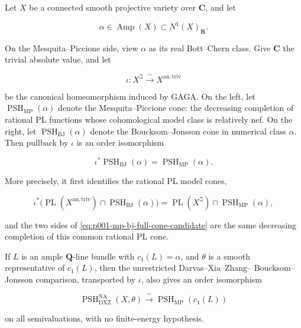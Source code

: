 
\begin{theorem}
\label{thm:p001-mp-bj-full-cone-candidate}
Let \(X\) be a connected smooth projective variety over \(\mathbf C\), and
let

\[
                     \alpha\in\operatorname{Amp}(X)
                              \subset N^1(X)_{\mathbf R}.
\]

On the Mesquita--Piccione side, view \(\alpha\) as its real Bott--Chern
class.  Give \(\mathbf C\) the trivial absolute value, and let

\[
 \iota:X^{\beth}\xrightarrow{\ \sim\ }X^{\mathrm{an,triv}}
\]

be the canonical homeomorphism induced by GAGA.  On the left, let
\(\operatorname{PSH}_{\mathrm{MP}}(\alpha)\) denote the
Mesquita--Piccione cone: the decreasing completion of rational PL
functions whose cohomological model class is relatively nef.  On the
right, let
\(\operatorname{PSH}_{\mathrm{BJ}}(\alpha)\) denote the
Boucksom--Jonsson cone in numerical class \(\alpha\).  Then pullback by
\(\iota\) is an order isomorphism

\begin{equation}
\label{eq:p001-mp-bj-full-cone-candidate}
 \iota^*\operatorname{PSH}_{\mathrm{BJ}}(\alpha)
       =\operatorname{PSH}_{\mathrm{MP}}(\alpha).
\end{equation}

More precisely, it first identifies the rational PL model cones,

\begin{equation}
\label{eq:p001-mp-bj-model-cone-candidate}
 \iota^*\bigl(\operatorname{PL}(X^{\mathrm{an,triv}})
          \cap\operatorname{PSH}_{\mathrm{BJ}}(\alpha)\bigr)
 =\operatorname{PL}(X^{\beth})
          \cap\operatorname{PSH}_{\mathrm{MP}}(\alpha),
\end{equation}

and the two sides of
\eqref{eq:p001-mp-bj-full-cone-candidate} are the same decreasing
completion of this common rational PL cone.

If \(L\) is an ample \(\mathbf Q\)-line bundle with
\(c_1(L)=\alpha\), and \(\theta\) is a smooth representative of
\(c_1(L)\), then the unrestricted Darvas--Xia--Zhang--
Boucksom--Jonsson comparison, transported by \(\iota\), also gives an
order isomorphism

\[
 \operatorname{PSH}^{\mathrm{NA}}_{\mathrm{DXZ}}(X,\theta)
       \xrightarrow{\ \sim\ }
 \operatorname{PSH}_{\mathrm{MP}}(c_1(L))
\]

on all semivaluations, with no finite-energy hypothesis.
\end{theorem}

